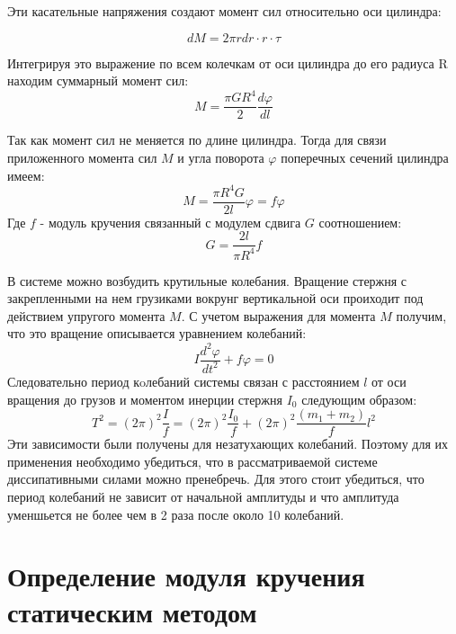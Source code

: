 \documentclass[a4paper, 12pt]{article}
\begin{document}
Эти касательные напряжения создают момент сил относительно оси цилиндра:

\begin{equation}
    dM=2\pi r dr \cdot r\cdot \tau  
\end{equation}

Интегрируя это выражение по всем колечкам от оси цилиндра до его радиуса R находим суммарный
момент сил:
\begin{equation}
    M = \frac{\pi G R^{4}}{2} \frac{d \varphi }{d l} 
\end{equation}

Так как момент сил не меняется по длине цилиндра. Тогда для связи приложенного
момента сил $M$ и угла поворота $\varphi$ поперечных сечений цилиндра имеем:
\begin{equation}
    M=\frac{\pi R^{4}G}{2l}\varphi=f \varphi
\end{equation}
Где $f$ - модуль кручения связанный с модулем сдвига $G$ соотношением:
\begin{equation}
    G=\frac{2l}{\pi R^{4}}f
\end{equation}

В системе можно возбудить крутильные колебания. Вращение стержня с закрепленными
на нем грузиками вокрунг вертикальной оси проиходит под действием упругого момента $M$.
С учетом выражения для момента $M$ получим, что это вращение описывается уравнением колебаний:
\begin{equation}
    I\frac{d^2 \varphi }{d t^2} + f \varphi =0
\end{equation}
Следовательно период кoлебаний системы связан с расстоянием $l$ от оси вращения до грузов и
моментом инерции стержня $I_0$ следующим образом:
\begin{equation}
    T^2=(2\pi)^2\frac{I}{f}=(2\pi)^2\frac{I_0}{f}+(2\pi)^2\frac{(m_1+m_2)}{f}l^2
\end{equation}
Эти зависимости были получены для незатухающих колебаний. Поэтому для их применения необходимо убедиться,
что в рассматриваемой системе диссипативными силами можно пренебречь. Для этого стоит убедиться, что период колебаний
не зависит от начальной амплитуды и что амплитуда уменшьется не более чем в 2 раза после около 10 колебаний.
\section{Определение модуля кручения статическим методом}
\end{document}
